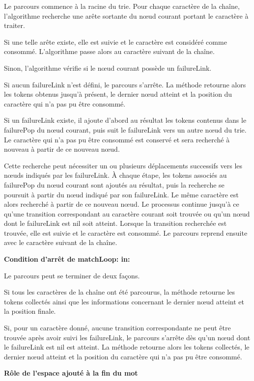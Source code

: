 \documentclass[12pt,a4paper]{report}
\begin{document}
	Le parcours commence à la racine du trie. Pour chaque caractère de la chaîne, l'algorithme recherche une arête sortante du nœud courant portant le caractère à traiter.
	
	Si une telle arête existe, elle est suivie et le caractère est considéré comme consommé. L'algorithme passe alors au caractère suivant de la chaîne.
	
	Sinon, l'algorithme vérifie si le nœud courant possède un failureLink.
	
	Si aucun failureLink n'est défini, le parcours s'arrête. La méthode retourne alors les tokens obtenus jusqu'à présent, le dernier nœud atteint et la position du caractère qui n'a pas pu être consommé.
	
	Si un failureLink existe, il ajoute d'abord au résultat les tokens contenus dans le failurePop du nœud courant, puis suit le failureLink vers un autre nœud du trie. Le caractère qui n'a pas pu être consommé est conservé et sera recherché à nouveau à partir de ce nouveau nœud.
	
	Cette recherche peut nécessiter un ou plusieurs déplacements successifs vers les nœuds indiqués par les failureLink. À chaque étape, les tokens associés au failurePop du nœud courant sont ajoutés au résultat, puis la recherche se poursuit à partir du nœud indiqué par son failureLink. Le même caractère est alors recherché à partir de ce nouveau nœud. Le processus continue jusqu'à ce qu'une transition correspondant au caractère courant soit trouvée ou qu'un nœud dont le failureLink est nil soit atteint. Lorsque la transition recherchée est trouvée, elle est suivie et le caractère est consommé. Le parcours reprend ensuite avec le caractère suivant de la chaîne.
	
	\textbf{Condition d'arrêt de matchLoop: in:}
	
	Le parcours peut se terminer de deux façons.
	
	Si tous les caractères de la chaîne ont été parcourus, la méthode retourne les tokens collectés ainsi que les informations concernant le dernier nœud atteint et la position finale.
	
	Si, pour un caractère donné, aucune transition correspondante ne peut être trouvée après avoir suivi les failureLink, le parcours s'arrête dès qu'un nœud dont le failureLink est nil est atteint. La méthode retourne alors les tokens collectés, le dernier nœud atteint et la position du caractère qui n'a pas pu être consommé.
	
	\textbf{Rôle de l'espace ajouté à la fin du mot}
	
\end{document}
